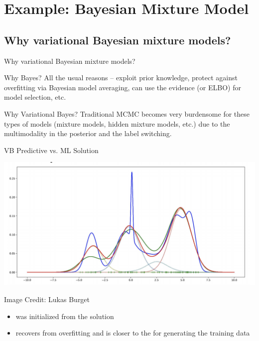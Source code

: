 \documentclass[10pt]{beamer}
\begin{document}
\section{Example: Bayesian Mixture Model}


\subsection{Why variational Bayesian mixture models?} 

\begin{frame}{Why variational Bayesian mixture models?}

\begin{block}{Why Bayes?}
All the usual reasons -- exploit prior knowledge,  protect against overfitting via Bayesian model averaging, can use the evidence (or ELBO) for model selection, etc.
\end{block}
\vfill
\begin{block}{Why Variational Bayes?}
Traditional MCMC becomes very burdensome for these types of models {\tiny (mixture models, hidden mixture models, etc.)} due to the multimodality in the posterior and the label switching. 
\end{block}	
\end{frame}

\begin{frame}{VB Predictive vs. ML Solution}

\begin{center}
\includegraphics[width=.9\textwidth]{images/ml_vs_vb}
\end{center}
\hfill \tiny{Image Credit: Lukas Burget} \normalsize

\begin{itemize}
\item {} was initialized from the  solution 
\item {} recovers from  overfitting and is closer to the  for generating the training data
\end{itemize}

\end{frame}
\end{document}
